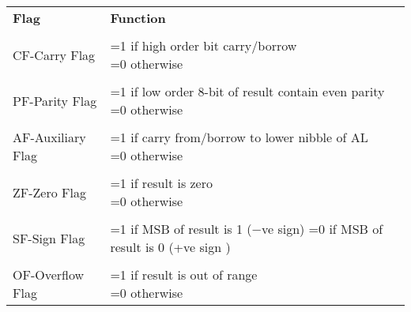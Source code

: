 \documentclass[12pt]{report}
\begin{document}
\begin{tabular}{ll}
  \textbf{Flag} & \textbf{Function}\\\\
  CF-Carry Flag & 
                  \parbox[t]{12cm}{ 
                  =1 if high order bit carry/borrow \\
  =0 otherwise
  } \\\\
  PF-Parity Flag & 
                   \parbox[t]{12cm}{ 
                   =1 if low order 8-bit of result contain even parity \\
  =0 otherwise
  } \\\\
  AF-Auxiliary Flag &
                      \parbox[t]{12cm}{
                      =1 if carry from/borrow to lower nibble of AL \\
  =0 otherwise
  }\\\\
  ZF-Zero Flag &
                 \parbox[t]{12cm}{
                 =1 if result is zero \\
  =0 otherwise
  } \\\\
  SF-Sign Flag &
                 \parbox[t]{12cm}{
                 =1 if MSB of result is 1 ($-$ve sign) \\
  =0 if MSB of result is 0 (+ve sign ) 
  }\\\\
  OF-Overflow Flag & 
                     \parbox[t]{12cm}{
                     =1 if result is out of range \\
  =0 otherwise 
  }
\end{tabular}
\end{document}
